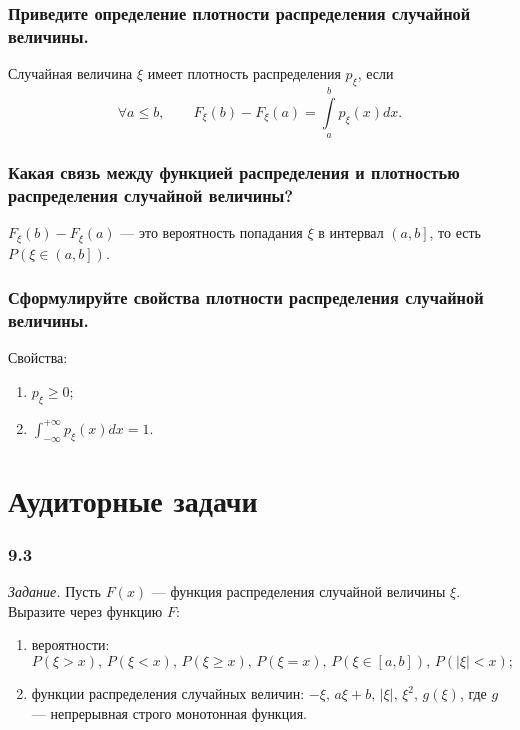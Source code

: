 \subsubsection*{Приведите определение плотности распределения случайной величины.}

Случайная величина $ \xi $ имеет плотность распределения $p_{ \xi }$, если
$$ \forall a \leq b, \qquad
F_{ \xi } \left( b \right) - F_{ \xi } \left( a \right) =
\int \limits_a^b p_{ \xi } \left( x \right) dx.$$

\subsubsection*{Какая связь между функцией распределения и плотностью распределения случайной величины?}

$F_{ \xi } \left( b \right) - F_{ \xi } \left( a \right) $ ---
это вероятность попадания $ \xi $ в интервал $ \left( a, b \right] $, то есть $P \left( \xi \in \left( a, b \right] \right) $.

\subsubsection*{Сформулируйте свойства плотности распределения случайной величины.}

Свойства:
\begin{enumerate}
\item $p_{ \xi } \geq 0$;
\item $ \int_{- \infty }^{+ \infty }p_{ \xi } \left( x \right) dx = 1$.
\end{enumerate}

\section*{Аудиторные задачи}

\subsubsection*{9.3}

\textit{Задание.} Пусть $F \left( x \right) $ --- функция распределения случайной величины $ \xi $.
Выразите через функцию $F$:
\begin{enumerate}[label=\alph*)]
\item вероятности:
$$P \left( \xi > x \right), \,
P \left( \xi < x \right), \,
P \left( \xi \geq x \right), \,
P \left( \xi = x \right), \,
P \left( \xi \in \left[ a, b \right] \right), \,
P \left( \left| \xi \right| < x \right);$$
\item функции распределения случайных величин:
$- \xi, \, a \xi + b, \, \left| \xi \right|, \, \xi^2, \, g \left( \xi \right) $, где $g$ --- непрерывная строго монотонная функция. 
\end{enumerate}

